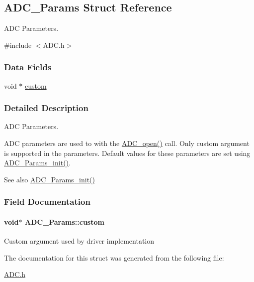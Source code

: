 \subsection{A\+D\+C\+\_\+\+Params Struct Reference}
\label{struct_a_d_c___params}


A\+D\+C Parameters.  




{\ttfamily \#include $<$A\+D\+C.\+h$>$}

\subsubsection*{Data Fields}
\begin{DoxyCompactItemize}
\item 
void $\ast$ \hyperlink{struct_a_d_c___params_a62c67d0ad10066d4e30e67d648937a32}{custom}
\end{DoxyCompactItemize}


\subsubsection{Detailed Description}
A\+D\+C Parameters. 

A\+D\+C parameters are used to with the \hyperlink{_a_d_c_8h_a9f3e5f311cda4df63e70660651b9314e}{A\+D\+C\+\_\+open()} call. Only custom argument is supported in the parameters. Default values for these parameters are set using \hyperlink{_a_d_c_8h_a21df1c0987f5cecb660581ae081c4dc7}{A\+D\+C\+\_\+\+Params\+\_\+init()}.

\begin{DoxySeeAlso}{See also}
\hyperlink{_a_d_c_8h_a21df1c0987f5cecb660581ae081c4dc7}{A\+D\+C\+\_\+\+Params\+\_\+init()} 
\end{DoxySeeAlso}


\subsubsection{Field Documentation}
\paragraph[{custom}]{\setlength{\rightskip}{0pt plus 5cm}void$\ast$ A\+D\+C\+\_\+\+Params\+::custom}\label{struct_a_d_c___params_a62c67d0ad10066d4e30e67d648937a32}
Custom argument used by driver implementation 

The documentation for this struct was generated from the following file\+:\begin{DoxyCompactItemize}
\item 
\hyperlink{_a_d_c_8h}{A\+D\+C.\+h}\end{DoxyCompactItemize}
